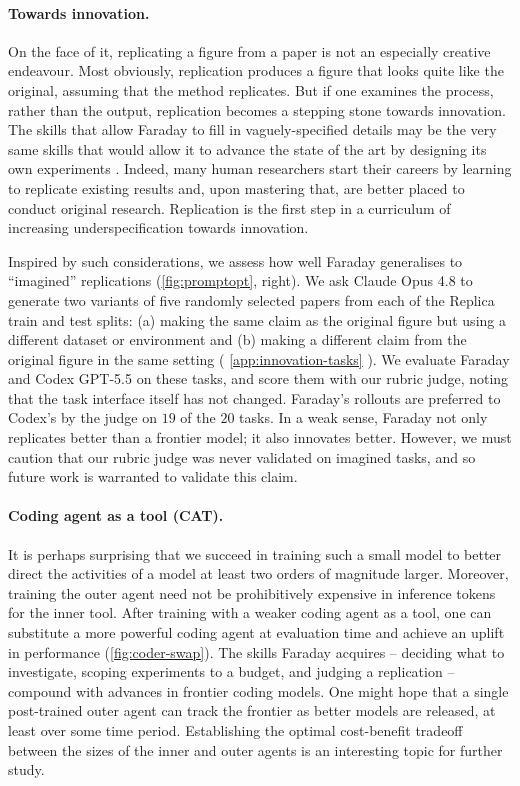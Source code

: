 \documentclass[garamond,a4paper]{inherent}
\renewcommand{\sectionautorefname}{Section}%
\renewcommand{\subsectionautorefname}{Section}%
\renewcommand{\subsubsectionautorefname}{Section}%
\DeclareRobustCommand{\appref}[1]{%
  \begingroup
  \renewcommand{\sectionautorefname}{Appendix}%
  \renewcommand{\subsectionautorefname}{Appendix}%
  \renewcommand{\subsubsectionautorefname}{Appendix}%
  \autoref{#1}%
  \endgroup}
\newcommand{\faradayname}{Faraday\xspace}
\begin{document}
\paragraph{Towards innovation.}
On the face of it, replicating a figure from a paper is not an especially creative endeavour.
Most obviously, replication produces a figure that looks quite like the original, assuming that the method replicates.
But if one examines the process, rather than the output, replication becomes a stepping stone towards innovation.
The skills that allow Faraday to fill in vaguely-specified details may be the very same skills that would allow it to advance the state of the art by designing its own experiments \citep{deutsch2011beginning, muthukrishna2016innovation, heyes2018cognitive, bhoopchand2023learning}.
Indeed, many human researchers start their careers by learning to replicate existing results and, upon mastering that, are better placed to conduct original research.
Replication is the first step in a curriculum of increasing underspecification towards innovation. 

Inspired by such considerations, we assess how well Faraday generalises to ``imagined'' replications (\autoref{fig:promptopt}, right).
We ask Claude Opus 4.8 to generate two variants of five randomly selected papers from each of the Replica train and test splits:
(a) making the same claim as the original figure but using a different dataset or environment and
(b) making a different claim from the original figure in the same setting (\appref{app:innovation-tasks}).
We evaluate Faraday and Codex GPT-5.5 on these tasks, and score them with our rubric judge, noting that the task interface itself has not changed.
Faraday's rollouts are preferred to Codex's by the judge on $19$ of the $20$ tasks.
In a weak sense, Faraday not only replicates better than a frontier model; it also innovates better.
However, we must caution that our rubric judge was never validated on imagined tasks, and so future work is warranted to validate this claim. 

\paragraph{Coding agent as a tool (CAT).}
It is perhaps surprising that we succeed in training such a small model to better direct the activities of a model at least two orders of magnitude larger.
Moreover, training the outer agent need not be prohibitively expensive in inference tokens for the inner tool.
After training with a weaker coding agent as a tool, one can substitute a more powerful coding agent at evaluation time and achieve an uplift in performance (\autoref{fig:coder-swap}).
The skills \faradayname acquires -- deciding what to investigate, scoping experiments to a budget, and judging a replication -- compound with advances in frontier coding models.
One might hope that a single post-trained outer agent can track the frontier as better models are released, at least over some time period.
Establishing the optimal cost-benefit tradeoff between the sizes of the inner and outer agents is an interesting topic for further study. 
\end{document}
